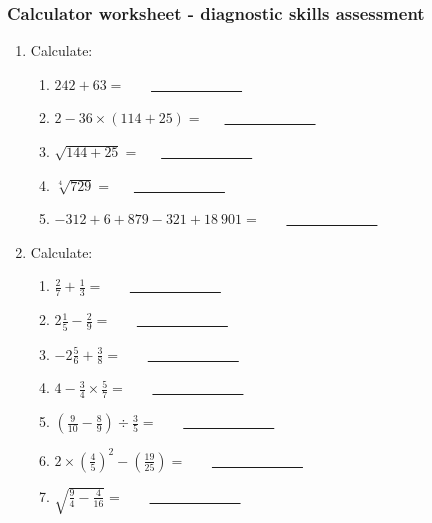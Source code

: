 \subsubsection{Calculator worksheet - diagnostic skills assessment}
\begin{enumerate}[itemsep=7pt, label=\textbf{\arabic*}. ] 
 \item Calculate:
\begin{enumerate}[itemsep=6pt,label=\textbf{(\alph*)}]
\item $ 242 + 63=$   ~~~\underline{~~~~~~~~~~~~~}
\item $2-36 \times (114 + 25)=$~~~\underline{~~~~~~~~~~~~~}
\item $\sqrt{144+25}=$~~~\underline{~~~~~~~~~~~~~}
\item $\sqrt[4]{729}=$~~~\underline{~~~~~~~~~~~~~}
\item $-312 + 6 + 879 -321 + 18~ 901=$ ~~~\underline{~~~~~~~~~~~~~}
\end{enumerate}

\item Calculate:
\begin{enumerate}[itemsep=6pt,label=\textbf{(\alph*)}]
\item $\frac{2}{7} + \frac{1}{3}=$  ~~~\underline{~~~~~~~~~~~~~}
\item $2\frac{1}{5} - \frac{2}{9}=$ ~~~\underline{~~~~~~~~~~~~~}
\item $-2\frac{5}{6} + \frac{3}{8}=$ ~~~\underline{~~~~~~~~~~~~~}
\item $ 4 - \frac{3}{4} \times \frac{5}{7}=$ ~~~\underline{~~~~~~~~~~~~~}
\item $\left(\frac{9}{10} - \frac{8}{9}\right) \div \frac{3}{5}=$ ~~~\underline{~~~~~~~~~~~~~}
\item $2\times \left(\frac{4}{5}\right)^2 - \left(\frac{19}{25}\right)=$ ~~~\underline{~~~~~~~~~~~~~}
\item $\sqrt{\frac{9}{4} - \frac{4}{16}} =$ ~~~\underline{~~~~~~~~~~~~~}
\end{enumerate}
\end{enumerate}

